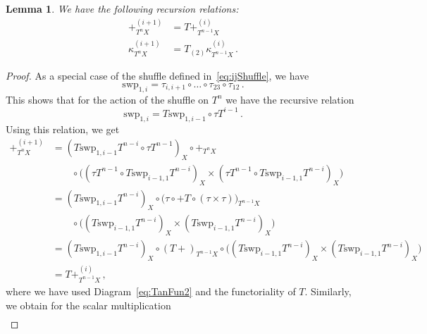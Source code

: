 \documentclass[12pt,reqno, a4paper]{amsart}
\numberwithin{equation}{section}
\theoremstyle{plain}
\newtheorem{Lemma}[Theorem]{Lemma}
\theoremstyle{definition}
\theoremstyle{remark}
\newcommand{\Swp}{\mathrm{swp}}
\begin{document}
\begin{Lemma}
We have the following recursion relations:
\begin{align}
\label{eq:AddPosRecurs}
  +^{(i+1)}_{T^n X}
  &= T+^{(i)}_{T^{n-1}X}
  \\
\label{eq:ScalMultPosRecurs}
  \kappa^{(i+1)}_{T^n X}
  &= T_{(2)} \kappa^{(i)}_{T^{n-1}X}
  \,.
\end{align}
\end{Lemma}

\begin{proof}
As a special case of the shuffle defined in~\eqref{eq:ijShuffle}, we have
\begin{equation*}
  \Swp_{1,i}
  = \tau_{i,i+1} \circ \ldots \circ
  \tau_{23} \circ \tau_{12}
  \,.
\end{equation*}
This shows that for the action of the shuffle on $T^n$ we have the recursive relation
\begin{equation*}
  \Swp_{1,i}
  = T\Swp_{1,i-1} \circ \tau T^{i-1}
  \,.
\end{equation*}
Using this relation, we get
\begin{equation*}
\begin{split}
  +_{T^n X}^{(i+1)}
  &=
  (T\Swp_{1,i-1}T^{n-i} \circ \tau T^{n-1})_X \circ +_{T^{n}X}
  \\
  &\qquad{}
  \circ
  \bigl((\tau T^{n-1} \circ T\Swp_{i-1,1}T^{n-i})_X \times
  (\tau T^{n-1} \circ T\Swp_{i-1,1}T^{n-i})_X \bigr)
  \\
  &=
  (T\Swp_{1,i-1}T^{n-i})_X \circ
  \bigl(\tau \circ +T \circ (\tau \times \tau)
  \bigr)_{T^{n-1}X}
  \\
  &\qquad{}
  \circ
  \bigl((T\Swp_{i-1,1}T^{n-i})_X \times
  (T\Swp_{i-1,1}T^{n-i})_X \bigr)
  \\
  &=
  (T\Swp_{1,i-1}T^{n-i})_X \circ  (T+)_{T^{n-1}X} \circ
  \bigl((T\Swp_{i-1,1}T^{n-i})_X \times
  (T\Swp_{i-1,1}T^{n-i})_X \bigr)
  \\
  &= T+_{T^{n-1}X}^{(i)}
  \,,
\end{split}
\end{equation*}
where we have used Diagram~\eqref{eq:TanFun2} and the functoriality of $T$. Similarly, we obtain for the scalar multiplication
\begin{equation*}
\begin{split}

\end{split}
\end{equation*}
\end{proof}
\end{document}
